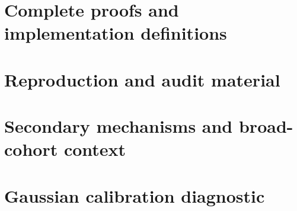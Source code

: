 \section{Complete proofs and implementation definitions}\label{app:a}
\setcounter{theorem}{0}\setcounter{proposition}{0}\setcounter{lemma}{0}\setcounter{corollary}{0}
\renewcommand{\thetheorem}{A.\arabic{theorem}}
\renewcommand{\theproposition}{A.\arabic{proposition}}
\renewcommand{\thelemma}{A.\arabic{lemma}}
\renewcommand{\thecorollary}{A.\arabic{corollary}}
\renewcommand{\theHtheorem}{appendix.\arabic{theorem}}
\renewcommand{\theHproposition}{appendix.\arabic{proposition}}
\renewcommand{\theHlemma}{appendix.\arabic{lemma}}
\renewcommand{\theHcorollary}{appendix.\arabic{corollary}}

\section{Reproduction and audit material}\label{app:b}

\section{Secondary mechanisms and broad-cohort context}\label{app:c}

\clearpage\section{Gaussian calibration diagnostic}\label{app:d}


